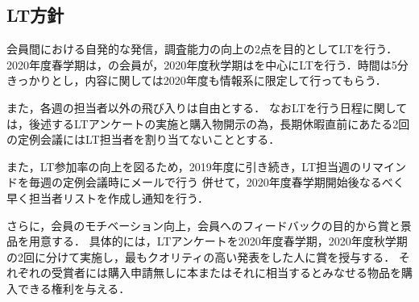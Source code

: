 \subsection*{LT方針}

会員間における自発的な発信，調査能力の向上の2点を目的としてLTを行う．
2020年度春学期は\secondGrade{}，\thirdGrade{}の会員が，2020年度秋学期は\firstGrade{}を中心にLTを行う．時間は5分きっかりとし，内容に関しては2020年度も情報系に限定して行ってもらう．

また，各週の担当者以外の飛び入りは自由とする．
なおLTを行う日程に関しては，後述するLTアンケートの実施と購入物開示の為，長期休暇直前にあたる2回の定例会議にはLT担当者を割り当てないこととする．

また，LT参加率の向上を図るため，2019年度に引き続き，LT担当週のリマインドを毎週の定例会議時にメールで行う
併せて，2020年度春学期開始後なるべく早く担当者リストを作成し通知を行う．

さらに，会員のモチベーション向上，会員へのフィードバックの目的から賞と景品を用意する．
具体的には，LTアンケートを2020年度春学期，2020年度秋学期の2回に分けて実施し，最もクオリティの高い発表をした人に賞を授与する．
それぞれの受賞者には購入申請無しに本またはそれに相当するとみなせる物品を購入できる権利を与える．
